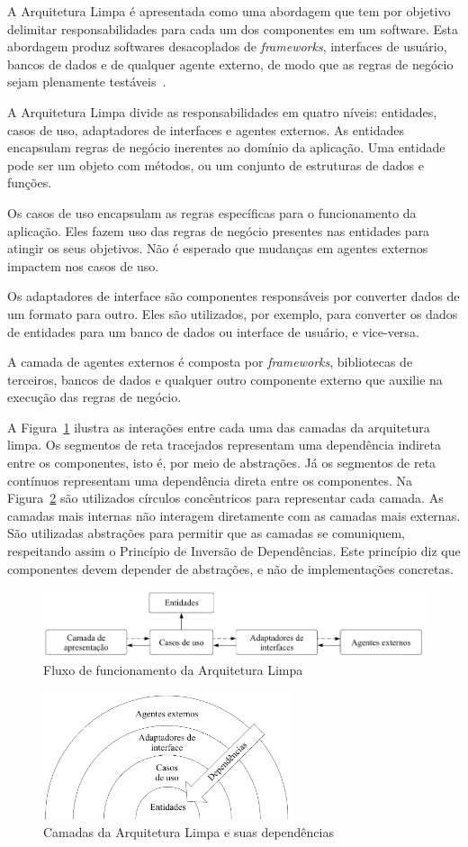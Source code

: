 A Arquitetura Limpa é apresentada como uma abordagem que tem por objetivo delimitar responsabilidades para cada um dos componentes em um software.
Esta abordagem produz softwares desacoplados de \emph{frameworks}, interfaces de usuário, bancos de dados e de qualquer agente externo, de modo que as regras de negócio sejam plenamente testáveis~\cite{clean-arch-book}.

A Arquitetura Limpa divide as responsabilidades em quatro níveis: entidades, casos de uso, adaptadores de interfaces e agentes externos.
As entidades encapsulam regras de negócio inerentes ao domínio da aplicação.
Uma entidade pode ser um objeto com métodos, ou um conjunto de estruturas de dados e funções.

Os casos de uso encapsulam as regras específicas para o funcionamento da aplicação.
Eles fazem uso das regras de negócio presentes nas entidades para atingir os seus objetivos.
Não é esperado que mudanças em agentes externos impactem nos casos de uso.

Os adaptadores de interface são componentes responsáveis por converter dados de um formato para outro.
Eles são utilizados, por exemplo, para converter os dados de entidades para um banco de dados ou interface de usuário, e vice-versa.

A camada de agentes externos é composta por \emph{frameworks}, bibliotecas de terceiros, bancos de dados e qualquer outro componente externo que auxilie na execução das regras de negócio.

A Figura~\ref{fig:clean_arch} ilustra as interações entre cada uma das camadas da arquitetura limpa.
Os segmentos de reta tracejados representam uma dependência indireta entre os componentes, isto é, por meio de abstrações.
Já os segmentos de reta contínuos representam uma dependência direta entre os componentes.
Na Figura~\ref{fig:clean_arch_circles} são utilizados círculos concêntricos para representar cada camada.
As camadas mais internas não interagem diretamente com as camadas mais externas.
São utilizadas abstrações para permitir que as camadas se comuniquem, respeitando assim o Princípio de Inversão de Dependências.
Este princípio diz que componentes devem depender de abstrações, e não de implementações concretas.

\begin{figure}[ht]
	\centering
	\includegraphics[width=1\textwidth]{images/clean_arch.png}
	\caption{Fluxo de funcionamento da Arquitetura Limpa}
	\label{fig:clean_arch}
\end{figure}

\begin{figure}[ht]
	\centering
	\includegraphics[width=0.65\textwidth]{images/clean_arch_circles.png}
	\caption{Camadas da Arquitetura Limpa e suas dependências}
	\label{fig:clean_arch_circles}
\end{figure}
